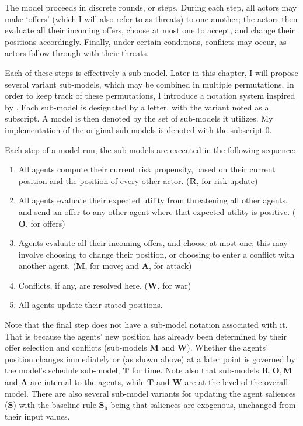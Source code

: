 The model proceeds in discrete rounds, or steps. During each step, all actors may make `offers' (which I will also refer to as threats) to one another; the actors then evaluate all their incoming offers, choose at most one to accept, and change their positions accordingly. Finally, under certain conditions, conflicts may occur, as actors follow through with their threats.

Each of these steps is effectively a sub-model. Later in this chapter, I will propose several variant sub-models, which may be combined in multiple permutations. In order to keep track of these permutations, I introduce a notation system inspired by \citet{epstein_1996}. Each sub-model is designated by a letter, with the variant noted as a subscript. A model is then denoted by the set of sub-models it utilizes. My implementation of the original sub-models is denoted with the subscript $0$.

Each step of a model run, the sub-models are executed in the following sequence:

\begin{enumerate}
    \item All agents compute their current risk propensity, based on their current position and the position of every other actor. ($\mathbf{R}$, for risk update)
    \item All agents evaluate their expected utility from threatening all other agents, and send an offer to any other agent where that expected utility is positive. ($\mathbf{O}$, for offers)
    \item Agents evaluate all their incoming offers, and choose at most one; this may involve choosing to change their position, or choosing to enter a conflict with another agent. ($\mathbf{M}$, for move; and $\mathbf{A}$, for attack)
    \item Conflicts, if any, are resolved here. ($\mathbf{W}$, for war)
    \item All agents update their stated positions.
\end{enumerate}

Note that the final step does not have a sub-model notation associated with it. That is because the agents' new position has already been determined by their offer selection and conflicts (sub-models $\mathbf{M}$ and $\mathbf{W}$). Whether the agents' position changes immediately or (as shown above) at a later point is governed by the model's schedule sub-model, $\mathbf{T}$ for time. Note also that sub-models $\mathbf{R, O, M}$ and $\mathbf{A}$ are internal to the agents, while  $\mathbf{T}$ and $\mathbf{W}$ are at the level of the overall model. There are also several sub-model variants for updating the agent saliences ($\mathbf{S}$) with the baseline rule $\mathbf{S_0}$ being that saliences are exogenous, unchanged from their input values.

